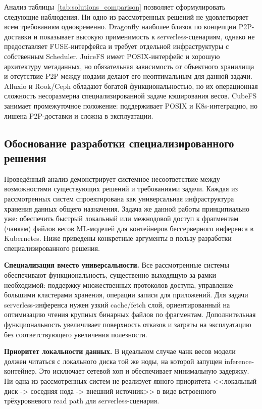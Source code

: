 Анализ таблицы~\ref{tab:solutions_comparison} позволяет сформулировать следующие наблюдения. Ни одно из рассмотренных решений не удовлетворяет всем требованиям одновременно. Dragonfly наиболее близок по концепции P2P-доставки и показывает высокую применимость к serverless-сценариям, однако не предоставляет FUSE-интерфейса и требует отдельной инфраструктуры с собственным Scheduler. JuiceFS имеет POSIX-интерфейс и хорошую архитектуру метаданных, но обязательная зависимость от объектного хранилища и отсутствие P2P между нодами делают его неоптимальным для данной задачи. Alluxio и Rook/Ceph обладают богатой функциональностью, но их операционная сложность несоразмерна специализированной задаче кэширования весов. CubeFS занимает промежуточное положение: поддерживает POSIX и K8s-интеграцию, но лишена P2P-доставки и сложна в эксплуатации.

\subsection{Обоснование разработки специализированного решения}
\label{sec:justification}

Проведённый анализ демонстрирует системное несоответствие между возможностями существующих решений и требованиями задачи. Каждая из рассмотренных систем спроектирована как универсальная инфраструктура хранения данных общего назначения. Задача же данной работы принципиально уже: обеспечить быстрый локальный или межнодовой доступ к фрагментам (чанкам) файлов весов ML-моделей для контейнеров бессерверного инференса в Kubernetes. Ниже приведены конкретные аргументы в пользу разработки специализированного решения.

\textbf{Специализация вместо универсальности.} Все рассмотренные системы обеспечивают функциональность, существенно выходящую за рамки необходимой: поддержку множественных протоколов доступа, управление большими кластерами хранения, операции записи для приложений. Для задачи serverless-инференса нужен узкий cache/fetch слой, ориентированный на оптимизацию чтения крупных бинарных файлов по фрагментам. Дополнительная функциональность увеличивает поверхность отказов и затраты на эксплуатацию без соответствующего увеличения полезности.

\textbf{Приоритет локальности данных.} В идеальном случае чанк весов модели должен читаться с локального диска той же ноды, на которой запущен inference-контейнер. Это исключает сетевой хоп и обеспечивает минимальную задержку. Ни одна из рассмотренных систем не реализует явного приоритета <<локальный диск -> соседняя нода -> внешний источник>> в виде встроенного трёхуровневого read path для serverless-сценария.

